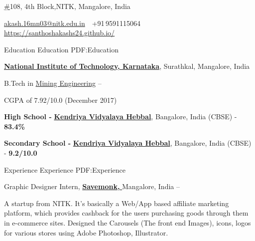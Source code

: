 \documentclass[letterpaper,MMMyyyy,nonstopmode]{simpleresumecv}
\newcommand{\CVAuthor}{Akash L}
\newcommand{\CVWebpage}{https://santhoshakashs24.github.io/}
\begin{document}

\Title{\CVAuthor}



\begin{SubTitle}
\href{https://goo.gl/maps/z6oyy6AG4ew}
\#108, 4th Block,NITK, Mangalore, India
\par
\href{mailto:akash.16mn03@nitk.edu.in}
{\color{blue} akash.16mn03@nitk.edu.in}
\,\SubBulletSymbol\,
+91\,9591115064
\,\SubBulletSymbol\,
\href{\CVWebpage}
{\color{blue} \url{\CVWebpage}}
\end{SubTitle}

\begin{Body}


\Section
{Education}
{Education}
{PDF:Education}

\Entry
\href{http://nitk.ac.in/}
{\color{blue} \textbf{National Institute of Technology, Karnataka}},
Surathkal, Mangalore, India

\Gap
\BulletItem
B.Tech in 
\href{http://mining.nitk.ac.in/}
{Mining Engineering}
\hfill
{} --
\begin{Detail}
\SubBulletItem
CGPA of 7.92/10.0 (December 2017)

\Gap
\BulletItem
{\textbf{High School - }} \href{http://www.kvhebbal.ac.in/}
{\color{blue} \textbf{Kendriya Vidyalaya Hebbal}}, Bangalore, India (CBSE) - \textbf{83.4\%}

\Gap
\BulletItem
{\textbf{Secondary School - }} \href{http://www.kvhebbal.ac.in/}
{\color{blue} \textbf{Kendriya Vidyalaya Hebbal}}, Bangalore, India (CBSE) - \textbf{9.2/10.0}



\Section
{Experience}
{Experience}
{PDF:Experience}

\Entry Graphic Designer Intern, 
\href{https://savemonk.com/}
{\color{blue} \textbf{Savemonk, }}Mangalore, India 
\hfill
{} --

\Gap
\BulletItem
A startup from NITK. It's basically a Web/App based affiliate marketing platform, which provides cashback for the users purchasing goods through them in e-commerce sites. Designed the Carousels (The front end Images), icons, logos for various stores using Adobe Photoshop, Illustrator.



\end{Detail}
\end{Body}
\end{document}
